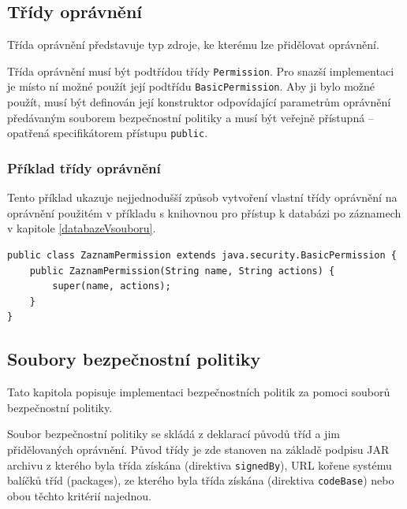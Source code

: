 \subsection{Třídy oprávnění}

Třída oprávnění představuje typ zdroje, ke kterému lze přidělovat oprávnění.

Třída oprávnění musí být podtřídou třídy {\tt Permission}. Pro snazší implementaci je místo ní možné použít její podtřídu {\tt BasicPermission}.
Aby ji bylo možné použít, musí být definován její konstruktor odpovídající parametrům oprávnění předávaným souborem bezpečnostní politiky a musí být veřejně přístupná -- opatřená specifikátorem přístupu {\tt public}.

\subsubsection{Příklad třídy oprávnění}

Tento příklad ukazuje nejjednodušší způsob vytvoření vlastní třídy oprávnění na oprávnění použitém v příkladu s knihovnou pro přístup k databázi po záznamech v kapitole \ref{databazeVsouboru}.

\begin{lstlisting}[caption=Demonstrační třída oprávnění, label=prikladOpravneni]
public class ZaznamPermission extends java.security.BasicPermission {
    public ZaznamPermission(String name, String actions) {
        super(name, actions);
    }
}
\end{lstlisting}

\subsection{Soubory bezpečnostní politiky}

Tato kapitola popisuje implementaci bezpečnostních politik za pomoci souborů bezpečnostní politiky.

Soubor bezpečnostní politiky se skládá z deklarací původů tříd a jim přidělovaných oprávnění.
Původ třídy je zde stanoven na základě podpisu JAR archivu z kterého byla třída získána (direktiva {\tt signedBy}), URL kořene systému balíčků tříd (packages), ze kterého byla třída získána (direktiva {\tt codeBase}) nebo obou těchto kritérií najednou. \cite[5.3.1]{oaks}

